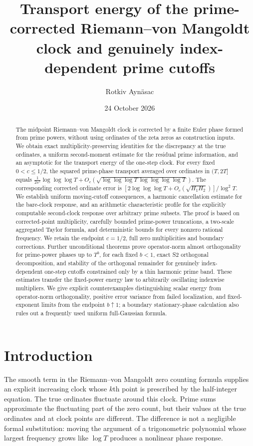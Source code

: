 \documentclass[11pt,reqno]{amsart}
\title[Transport energy of the corrected clock]{Transport energy of the prime-corrected Riemann--von Mangoldt clock and genuinely index-dependent prime cutoffs}
\author{Rotkiv Ayn\"asac}
\date{24 October 2026}
\numberwithin{equation}{section}
\begin{document}
\begin{abstract}
The midpoint Riemann--von Mangoldt clock is corrected by a finite Euler phase formed from prime powers, without using ordinates of the zeta zeros as construction inputs. We obtain exact multiplicity-preserving identities for the discrepancy at the true ordinates, a uniform second-moment estimate for the residual prime information, and an asymptotic for the transport energy of the one-step clock. For every fixed $0<c\le1/2$, the squared prime-phase transport averaged over ordinates in $(T,2T]$ equals $\frac1{2\pi^2}\log\log\log T+O_c(\sqrt{\log\log\log T\,\log\log\log\log T})$. The corresponding corrected ordinate error is $[2\log\log\log T+O_c(\sqrt{H_1H_2})]/\log^2T$. We establish uniform moving-cutoff consequences, a harmonic cancellation estimate for the bare-clock response, and an arithmetic characteristic profile for the explicitly computable second-clock response over arbitrary prime subsets. The proof is based on corrected-point multiplicity, carefully bounded prime-power truncations, a two-scale aggregated Taylor formula, and deterministic bounds for every nonzero rational frequency. We retain the endpoint $c=1/2$, full zero multiplicities and boundary corrections. Further unconditional theorems prove operator-norm almost orthogonality for prime-power phases up to $T^b$, for each fixed $b<1$, exact S2 orthogonal decomposition, and stability of the orthogonal remainder for genuinely index-dependent one-step cutoffs constrained only by a thin harmonic prime band. These estimates transfer the fixed-power energy law to arbitrarily oscillating indexwise multipliers. We give explicit counterexamples distinguishing scalar energy from operator-norm orthogonality, positive error variance from failed localization, and fixed-exponent limits from the endpoint $b\uparrow1$; a boundary stationary-phase calculation also rules out a frequently used uniform full-Gaussian formula.
\end{abstract}
\maketitle
\tableofcontents
\section{Introduction}
The smooth term in the Riemann--von Mangoldt zero counting formula supplies an explicit increasing clock whose $k$th point is prescribed by the half-integer equation. The true ordinates fluctuate around this clock. Prime sums approximate the fluctuating part of the zero count, but their values at the true ordinates and at clock points are different. The difference is not a negligible formal substitution: moving the argument of a trigonometric polynomial whose largest frequency grows like $\log T$ produces a nonlinear phase response.
\end{document}
